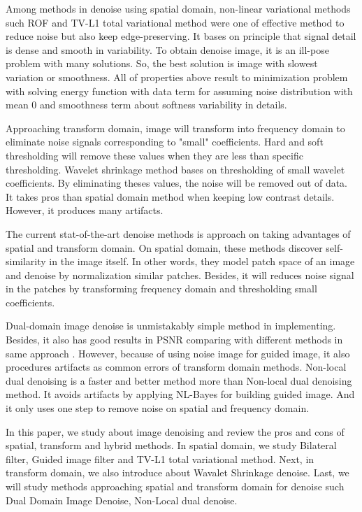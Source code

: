 Among methods in denoise using spatial domain, non-linear variational methods such ROF and TV-L1 total variational method \cite{Rudin1992, Chambolle2010} were one of effective method to reduce noise but also keep edge-preserving. It bases on principle that signal detail is dense and smooth in variability. To obtain denoise image, it is an ill-pose problem with many solutions. So, the best solution is image with slowest variation or smoothness. All of properties above result to minimization problem with solving energy function with data term for assuming noise distribution with mean 0 and smoothness term about softness variability in details.

Approaching  transform domain, image will transform into frequency domain to eliminate noise signals corresponding to "small" coefficients. Hard and soft thresholding will remove these values when they are less than specific thresholding. Wavelet shrinkage method \cite{fodor2003denoising} bases on thresholding of small wavelet coefficients. By eliminating theses values, the noise will be removed out of data. It takes pros than spatial domain method when keeping low contrast details. However, it produces many artifacts.

The current stat-of-the-art denoise methods is approach on taking advantages of spatial and transform domain. On spatial domain, these methods discover self-similarity in the image itself. In other words, they model patch space of an image and denoise by normalization similar patches. Besides, it will reduces noise signal in the patches by transforming frequency domain and thresholding small coefficients.

Dual-domain image denoise \cite{Knaus2013} is unmistakably simple method in implementing. Besides, it also has good results in PSNR comparing with different methods in same approach \cite{Dabov2009,Lebrun2012}. However, because of using noise image for guided image, it also procedures artifacts as common errors of transform domain methods. Non-local dual denoising \cite{Pierazzo2014} is a faster and better method more than Non-local dual denoising method. It avoids artifacts by applying NL-Bayes for building guided image. And it only uses one step to remove noise on spatial and frequency domain.

In this paper, we study about image denoising and review the pros and cons of spatial, transform and hybrid methods. In spatial domain, we study Bilateral filter, Guided image filter and TV-L1 total variational method. Next, in transform domain, we also introduce about Wavalet Shrinkage denoise. Last, we will study methods approaching spatial and transform domain for denoise such Dual Domain Image Denoise, Non-Local dual denoise.

